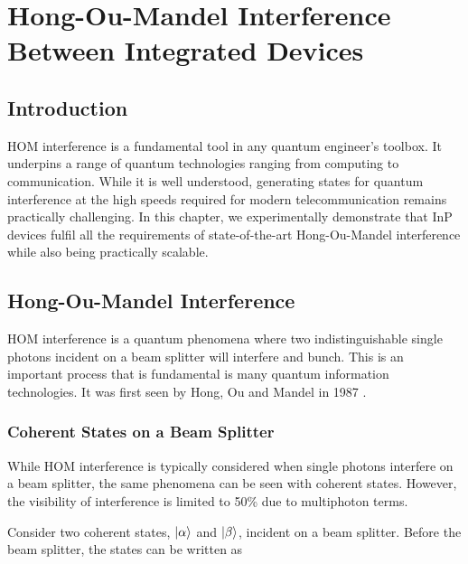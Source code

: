 %
%
\graphicspath{{./chapters/chapter03/fig03/}}

\let\textcircled=\pgftextcircled
\chapter[HOM Interference Between Integrated Devices]{Hong-Ou-Mandel Interference Between Integrated Devices}
\label{chap:hom}

\section{Introduction}

\ac{HOM} interference is a fundamental tool in any quantum engineer's toolbox. It underpins a range of quantum technologies ranging from computing to communication. While it is well understood, generating states for quantum interference at the high speeds required for modern telecommunication remains practically challenging. In this chapter, we experimentally demonstrate that \ac{InP} devices fulfil all the requirements of state-of-the-art Hong-Ou-Mandel interference while also being practically scalable. 

\section{Hong-Ou-Mandel Interference}

\Ac{HOM} interference is a quantum phenomena where two indistinguishable single photons incident on a beam splitter will interfere and bunch. This is an important process that is fundamental is many quantum information technologies. It was first seen by Hong, Ou and Mandel in 1987 \cite{HOM}.

\subsection{Coherent States on a Beam Splitter}

While \ac{HOM} interference is typically considered when single photons interfere on a beam splitter, the same phenomena can be seen with coherent states.  However, the visibility of interference is limited to 50\% \cite{Rarity2005} due to multiphoton terms.

Consider two coherent states, $\ket{\alpha}$ and $\ket{\beta}$, incident on a beam splitter. Before the beam splitter, the states can be written as

